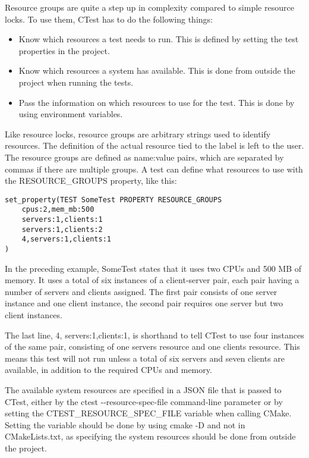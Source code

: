 Resource groups are quite a step up in complexity compared to simple resource locks. To use them, CTest has to do the following things:

\begin{itemize}
\item 
Know which resources a test needs to run. This is defined by setting the test properties in the project.

\item 
Know which resources a system has available. This is done from outside the project when running the tests.

\item 
Pass the information on which resources to use for the test. This is done by using environment variables.
\end{itemize}

Like resource locks, resource groups are arbitrary strings used to identify resources. The definition of the actual resource tied to the label is left to the user. The resource groups are defined as name:value pairs, which are separated by commas if there are multiple groups. A test can define what resources to use with the RESOURCE\_GROUPS property, like this:

\begin{lstlisting}[style=styleCMake]
set_property(TEST SomeTest PROPERTY RESOURCE_GROUPS
	cpus:2,mem_mb:500
	servers:1,clients:1
	servers:1,clients:2
	4,servers:1,clients:1
)
\end{lstlisting}

In the preceding example, SomeTest states that it uses two CPUs and 500 MB of memory. It uses a total of six instances of a client-server pair, each pair having a number of servers and clients assigned. The first pair consists of one server instance and one client instance, the second pair requires one server but two client instances.

The last line, 4, servers:1,clients:1, is shorthand to tell CTest to use four instances of the same pair, consisting of one servers resource and one clients resource. This means this test will not run unless a total of six servers and seven clients are available, in addition to the required CPUs and memory.

The available system resources are specified in a JSON file that is passed to CTest, either by the ctest -{}-resource-spec-file command-line parameter or by setting the CTEST\_RESOURCE\_SPEC\_FILE variable when calling CMake. Setting the variable should be done by using cmake -D and not in CMakeLists.txt, as specifying the system resources should be done from outside the project.

